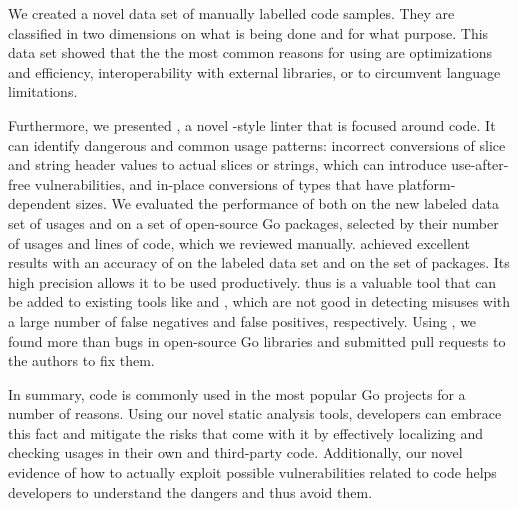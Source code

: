 We created a novel data set of \numberLabeledCodeSnippets{} manually labelled \unsafe{} code samples.
They are classified in two dimensions on what is being done and for what purpose.
This data set showed that the the most common reasons for using \unsafe{} are optimizations and efficiency,
interoperability with external libraries, or to circumvent language limitations.

Furthermore, we presented \toolSafer{}, a novel \toolVet{}-style linter that is focused around \unsafe{} code.
It can identify  dangerous and common usage patterns: incorrect conversions of slice and string header
values to actual slices or strings, which can introduce use-after-free vulnerabilities, and in-place conversions of
types that have platform-dependent sizes.
We evaluated the performance of \toolSafer{} both on the new labeled data set of \unsafe{} usages and on a set of
open-source Go packages, selected by their number of \unsafe{} usages and lines of code, which we reviewed manually.
\toolSafer{} achieved excellent results with an accuracy of \goSaferEvaluationDatasetGosaferAccuracy{} on the labeled
data set and \goSaferEvaluationPackagesGosaferAccuracy{} on the set of packages.
Its high precision allows it to be used productively.
\toolSafer{} thus is a valuable tool that can be added to existing tools like \toolVet{} and \toolGosec{}, which are
not good in detecting \unsafe{} misuses with a large number of false negatives and false positives, respectively.
Using \toolSafer{}, we found more than \numberBugsFixedRounded{} bugs in open-source Go libraries and submitted
\numberPRs{} pull requests to the authors to fix them.

In summary, \unsafe{} code is commonly used in the most popular Go projects for a number of reasons.
Using our novel static analysis tools, developers can embrace this fact and mitigate the risks that come with it by
effectively localizing and checking \unsafe{} usages in their own and third-party code.
Additionally, our novel evidence of how to actually exploit possible vulnerabilities related to \unsafe{} code helps
developers to understand the dangers and thus avoid them.
